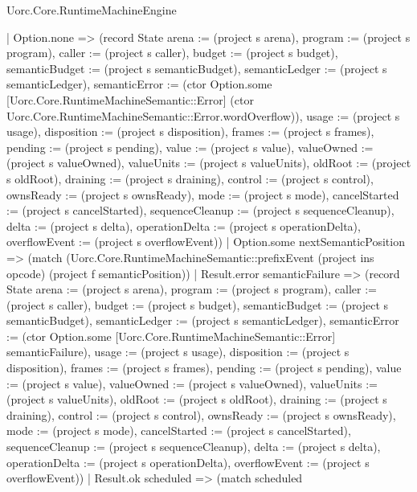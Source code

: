 \begin{lexlean}{Uorc.Core.RuntimeMachineEngine}
\begin{semanticmodule}
{        | Option.none => (record State {arena := (project s arena), program := (project s program), caller := (project s caller), budget := (project s budget), semanticBudget := (project s semanticBudget), semanticLedger := (project s semanticLedger), semanticError := (ctor Option.some [Uorc.Core.RuntimeMachineSemantic::Error] (ctor Uorc.Core.RuntimeMachineSemantic::Error.wordOverflow)), usage := (project s usage), disposition := (project s disposition), frames := (project s frames), pending := (project s pending), value := (project s value), valueOwned := (project s valueOwned), valueUnits := (project s valueUnits), oldRoot := (project s oldRoot), draining := (project s draining), control := (project s control), ownsReady := (project s ownsReady), mode := (project s mode), cancelStarted := (project s cancelStarted), sequenceCleanup := (project s sequenceCleanup), delta := (project s delta), operationDelta := (project s operationDelta), overflowEvent := (project s overflowEvent)})
        | Option.some nextSemanticPosition => (match (Uorc.Core.RuntimeMachineSemantic::prefixEvent (project ins opcode) (project f semanticPosition))
          | Result.error semanticFailure => (record State {arena := (project s arena), program := (project s program), caller := (project s caller), budget := (project s budget), semanticBudget := (project s semanticBudget), semanticLedger := (project s semanticLedger), semanticError := (ctor Option.some [Uorc.Core.RuntimeMachineSemantic::Error] semanticFailure), usage := (project s usage), disposition := (project s disposition), frames := (project s frames), pending := (project s pending), value := (project s value), valueOwned := (project s valueOwned), valueUnits := (project s valueUnits), oldRoot := (project s oldRoot), draining := (project s draining), control := (project s control), ownsReady := (project s ownsReady), mode := (project s mode), cancelStarted := (project s cancelStarted), sequenceCleanup := (project s sequenceCleanup), delta := (project s delta), operationDelta := (project s operationDelta), overflowEvent := (project s overflowEvent)})
          | Result.ok scheduled => (match scheduled
}
\end{semanticmodule}
\end{lexlean}
